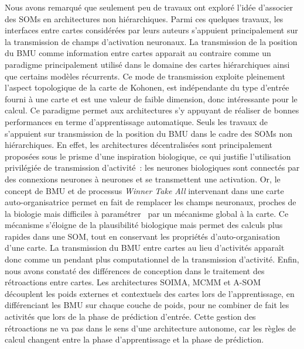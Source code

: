 \documentclass[../main]{subfiles}
\begin{document}
Nous avons remarqué que seulement peu de travaux ont exploré l'idée d'associer des SOMs en architectures non hiérarchiques. Parmi ces quelques travaux, les interfaces entre cartes considérées par leurs auteurs s'appuient principalement sur la transmission de champs d'activation neuronaux.
La transmission de la position du BMU comme information entre cartes apparait au contraire comme un paradigme principalement utilisé dans le domaine des cartes hiérarchiques ainsi que certains modèles récurrents.
Ce mode de transmission exploite pleinement l'aspect topologique de la carte de Kohonen, est indépendante du type d'entrée fourni à une carte et est une valeur de faible dimension, donc intéressante pour le calcul. Ce paradigme permet aux architectures s'y appuyant de réaliser de bonnes performances en terme d'apprentissage automatique.
Seuls les travaux de \cite{dominey13} s'appuient sur transmission de la position du BMU dans le cadre des SOMs non hiérarchiques.
En effet, les architectures décentralisées sont principalement proposées sous le prisme d'une inspiration biologique, ce qui justifie l'utilisation privilégiée de transmission d'activité~: les neurones biologiques sont connectés par des connexions neurones à neurones et se transmettent une activation. 
Or, le concept de BMU et de processus \emph{Winner Take All} intervenant dans une carte auto-organisatrice permet en fait de remplacer les champs neuronaux, proches de la biologie mais difficiles à paramétrer~\parencite{fix:hal-00869726} par un mécanisme global à la carte. Ce mécanisme s'éloigne de la plausibilité biologique mais permet des calculs plus rapides dans une SOM, tout en conservant les propriétés d'auto-organisation d'une carte. La transmission du BMU entre cartes au lieu d'activités apparaît donc comme un pendant plus computationnel de la transmission d'activité.
Enfin, nous avons constaté des différences de conception dans le traitement des rétroactions entre cartes. Les architectures SOIMA, MCMM et A-SOM découplent les poids externes et contextuels des cartes lors de l'apprentissage, en différenciant les BMU sur chaque couche de poids, pour ne combiner de fait les activités que lors de la phase de prédiction d'entrée. 
Cette gestion des rétroactions ne va pas dans le sens d'une architecture autonome, car les règles de calcul changent entre la phase d'apprentissage et la phase de prédiction.
\end{document}
